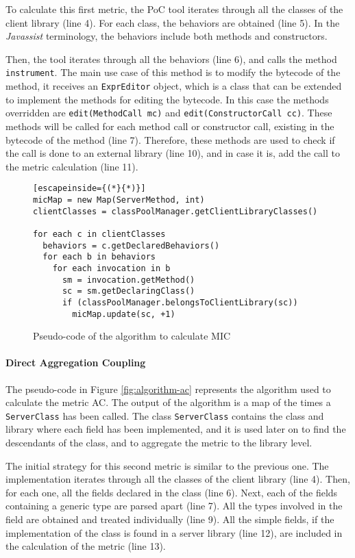 To calculate this first metric, the PoC tool iterates through all the classes of the client library (line 4). For each class, the behaviors are obtained (line 5). In the \textit{Javassist} terminology, the behaviors include both methods and constructors.

Then, the tool iterates through all the behaviors (line 6), and calls the method \texttt{instrument}. The main use case of this method is to modify the bytecode of the method, it receives an \texttt{ExprEditor} object, which is a class that can be extended to implement the methods for editing the bytecode. In this case the methods overridden are \texttt{edit(MethodCall mc)} and \texttt{edit(ConstructorCall cc)}. These methods will be called for each method call or constructor call, existing in the bytecode of the method (line 7). Therefore, these methods are used to check if the call is done to an external library (line 10), and in case it is, add the call to the metric calculation (line 11).

\begin{figure}[ht!]
\begin{lstlisting}[escapeinside={(*}{*)}]
micMap = new Map(ServerMethod, int)
clientClasses = classPoolManager.getClientLibraryClasses()

for each c in clientClasses
  behaviors = c.getDeclaredBehaviors()
  for each b in behaviors
    for each invocation in b
      sm = invocation.getMethod()
      sc = sm.getDeclaringClass()
      if (classPoolManager.belongsToClientLibrary(sc))
        micMap.update(sc, +1)
\end{lstlisting}
\caption{Pseudo-code of the algorithm to calculate MIC}
\label{fig:algorithm-mic}
\end{figure}

\paragraph{Direct Aggregation Coupling}
The pseudo-code in Figure \ref{fig:algorithm-ac} represents the algorithm used to calculate the metric AC. The output of the algorithm is a map of the times a \texttt{ServerClass} has been called. The class \texttt{ServerClass} contains the class and library where each field has been implemented, and it is used later on to find the descendants of the class, and to aggregate the metric to the library level.

The initial strategy for this second metric is similar to the previous one. The implementation iterates through all the classes of the client library (line 4). Then, for each one, all the fields declared in the class (line 6). Next, each of the fields containing a generic type are parsed apart (line 7). All the types involved in the field are obtained and treated individually (line 9). All the simple fields, if the implementation of the class is found in a server library (line 12), are included in the calculation of the metric (line 13).

